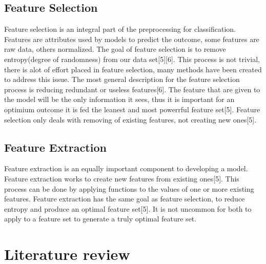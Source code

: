 \documentclass[confrence]{IEEEtran}
\begin{document}
\subsection*{Feature Selection}
Feature selection is an integral part of the preprocessing for classification.
Features are attributes used by models to predict the outcome, some features are raw data, others normalized.
The goal of feature selection is to remove entropy(degree of randomness) from our data set[5][6].
This process is not trivial, there is alot of effort placed in feature selection, many methods have been created to address this issue.
The most general description for the feature selection process is reducing redundant or useless features[6].
The feature that are given to the model will be the only information it sees, thus it is important for an optimium outcome it is fed the leanest and most powerrful feature set[5].
Feature selection only deals with removing of existing features, not creating new ones[5].
\subsection*{Feature Extraction}
Feature extraction is an equally important component to developing a model.
Feature extraction works to create new features from existing ones[5].
This process can be done by applying functions to the values of one or more existing features.
Feature extraction has the same goal as feature selection, to reduce entropy and produce an optimal feature set[5].
It is not uncommon for both to apply to a feature set to generate a truly optimal feature set.
\section*{Literature review}
\end{document}
